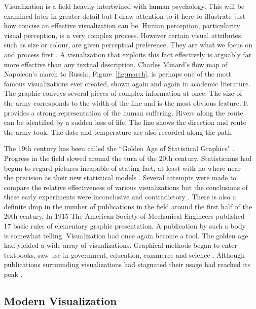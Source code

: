 \documentclass[a4paper, 10pt, titlepage, twocolumn, onehalfspace]{article}
\begin{document}
Visualization is a field heavily intertwined with human psychology. This will be examined later in greater detail but I draw attention to it here to illustrate just how concise an effective visualization can be. Human perception, particularity visual perception, is a very complex process. However certain visual attributes, such as size or colour, are given perceptual preference. They are what we focus on and process first \cite{mackinlay1986automating}. A visualization that exploits this fact effectively is arguably far more effective than any textual description. Charles Minard's flow map of Napoleon's march to Russia, Figure~\ref{fig:march}, is perhaps one of the most famous visualizations ever created, shown again and again in academic literature. The graphic conveys several pieces of complex information at once. The size of the army corresponds to the width of the line and is the most obvious feature. It provides a strong representation of the human suffering. Rivers along the route can be identified by a sudden loss of life. The line shows the direction and route the army took. The date and temperature are also recorded along the path.

The 19th century has been called the ``Golden Age of Statistical Graphics" \cite{friendly2008golden}. Progress in the field slowed around the turn of the 20th century. Statisticians had begun to regard pictures incapable of stating fact, at least with no where near the precision as their new statistical models \cite{friendly2000discussion}. Several attempts were made to compare the relative effectiveness of various visualizations but the conclusions of these early experiments were inconclusive and contradictory \cite{fienberg1979graphical}. There is also a definite drop in the number of publications in the field around the first half of the 20th century. In 1915 The American Society of Mechanical Engineers published 17 basic rules of elementary graphic presentation. A publication by such a body is somewhat telling. Visualization had once again become a tool. The golden age had yielded a wide array of visualizations. Graphical methods began to enter textbooks, saw use in government, education, commerce and science \cite{haskell1919make,ayres1919war,gantt1919organization}. Although publications surrounding visualizations had stagnated their usage had reached its peak \cite{fienberg1979graphical}.

\subsection{Modern Visualization}
\end{document}
